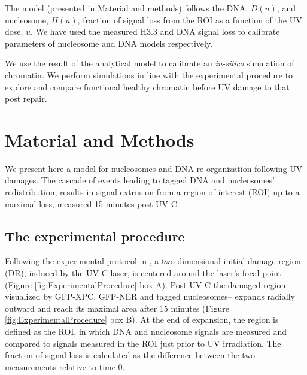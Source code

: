 \documentclass[12pt]{article}
\begin{document}
	The model (presented in Material and methods) follows the DNA, $D(u)$,
	and nucleosome, $H(u)$, fraction of signal loss from the ROI as a function of
	the UV dose, $u$. We have used the measured H3.3 and DNA signal loss to
	calibrate parameters of nucleosome and DNA models respectively.
	
	We use the result of the analytical model to calibrate an \textit{in-silico} simulation of chromatin. We perform simulations in line with the experimental procedure to explore and compare functional healthy chromatin before UV damage to that post repair. %
		
 \section{Material and Methods} 
	
	We present here a model for nucleosomes and DNA re-organization following
	UV damages. The cascade of events leading to tagged DNA and nucleosomes'
	redistribution, results in signal extrusion from a region of interest (ROI) up
	to a maximal loss, measured 15 minutes post UV-C.
	
 \subsection{The experimental procedure}
	Following the experimental protocol in \cite{adam2015imaging}, a two-dimensional initial damage region (DR), induced by the UV-C laser, is centered around the laser's focal point (Figure \ref{fig:ExperimentalProcedure} box A). Post UV-C the damaged region-- visualized by GFP-XPC, GFP-NER and tagged nucleosomes-- expands radially outward and reach its maximal area after 15 minutes (Figure \ref{fig:ExperimentalProcedure} box B). At the end of expansion, the region is defined as the ROI, in which DNA and nucleosome signals are measured and compared to signals measured in the ROI just prior to UV irradiation. The fraction of signal loss is calculated as the difference between the two measurements relative to time 0.
	
\end{document}
